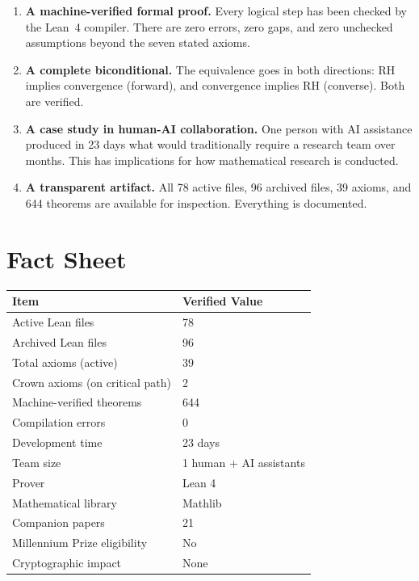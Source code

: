 \documentclass[11pt,a4paper]{article}
\begin{document}
\begin{enumerate}
  \item \textcolor{correct}{\textbf{A machine-verified formal
    proof.}} Every logical step has been checked by the Lean~4
    compiler. There are zero errors, zero gaps, and zero
    unchecked assumptions beyond the seven stated axioms.

  \item \textcolor{correct}{\textbf{A complete biconditional.}}
    The equivalence goes in both directions: RH implies convergence
    (forward), and convergence implies RH (converse). Both are
    verified.

  \item \textcolor{correct}{\textbf{A case study in human-AI
    collaboration.}} One person with AI assistance produced in
    23 days what would traditionally require a research team over
    months. This has implications for how mathematical research
    is conducted.

  \item \textcolor{correct}{\textbf{A transparent artifact.}}
    All 78 active files, 96 archived files, 39 axioms, and 644
    theorems are available for inspection. Everything is
    documented.
\end{enumerate}

\section{Fact Sheet}

\begin{center}
\begin{tabular}{@{}ll@{}}
\toprule
\textbf{Item} & \textbf{Verified Value} \\
\midrule
Active Lean files & 78 \\
Archived Lean files & 96 \\
Total axioms (active) & 39 \\
Crown axioms (on critical path) & 2 \\
Machine-verified theorems & 644 \\
Compilation errors & 0 \\
Development time & 23 days \\
Team size & 1 human + AI assistants \\
Prover & Lean 4 \\
Mathematical library & Mathlib \\
Companion papers & 21 \\
Millennium Prize eligibility & No \\
Cryptographic impact & None \\
\bottomrule
\end{tabular}
\end{center}
\end{document}
